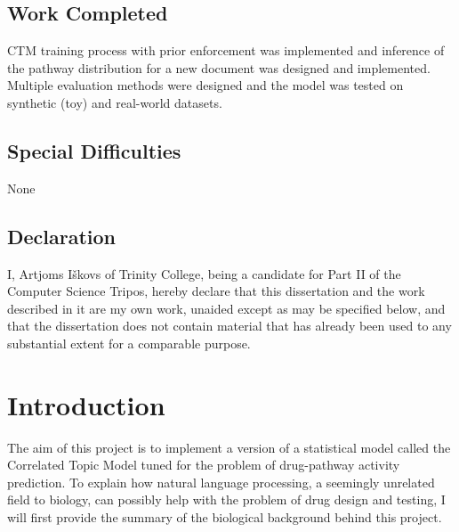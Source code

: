 \documentclass[12pt,a4paper,twoside,openright]{report}
\begin{document}
\section*{Work Completed}
CTM training process with prior enforcement was implemented and inference of the pathway distribution for a new document was designed and implemented. Multiple evaluation methods were designed and the model was tested on synthetic (toy) and real-world datasets.

\section*{Special Difficulties}
None
 
\newpage
\section*{Declaration}

I, Artjoms I\v{s}kovs of Trinity College, being a candidate for Part II of the Computer
Science Tripos, hereby declare that this dissertation and the work described in it are my own work,
unaided except as may be specified below, and that the dissertation does not contain material that has already been used to any substantial
extent for a comparable purpose.

\bigskip
{}

\medskip
{}

\tableofcontents

\listoffigures




\pagestyle{headings}

\chapter{Introduction}

The aim of this project is to implement a version of a statistical model called the Correlated Topic Model tuned for the problem of drug-pathway activity prediction. To explain how natural language processing, a seemingly unrelated field to biology, can possibly help with the problem of drug design and testing, I will first provide the summary of the biological background behind this project.
\end{document}
